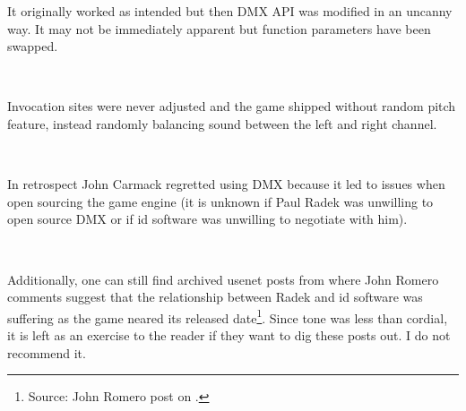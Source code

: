 It originally worked as intended but then DMX API was modified in an uncanny way. It may not be immediately apparent but function  parameters have been swapped.\\
\par
{}\\
\par
 Invocation sites were never adjusted and the game shipped without random pitch feature, instead randomly balancing sound between the left and right channel.\\
\par
{}\\
\par
In retrospect John Carmack regretted using DMX because it led to issues when open sourcing the game engine (it is unknown if Paul Radek was unwilling to open source DMX or if id software was unwilling to negotiate with him).\\
\par
{}\\
\par
Additionally, one can still find archived usenet posts from  where John Romero comments suggest that the relationship between Radek and id software was suffering as the game neared its released date\footnote{Source: John Romero post on .}. Since tone was less than cordial, it is left as an exercise to the reader if they want to dig these posts out. I do not recommend it.



